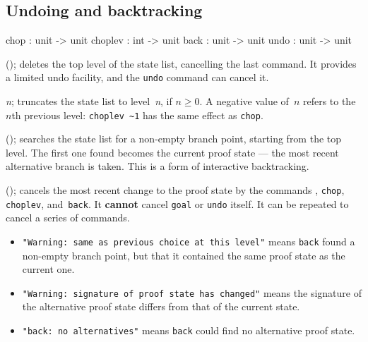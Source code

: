 \subsection{Undoing and backtracking}
\begin{ttbox} 
chop    : unit -> unit
choplev : int -> unit
back    : unit -> unit
undo    : unit -> unit
\end{ttbox}
\begin{ttdescription}
\item[\ttindexbold{chop}();] 
deletes the top level of the state list, cancelling the last 
command.  It provides a limited undo facility, and the {\tt undo} command
can cancel it.

\item[\ttindexbold{choplev} {\it n};] 
truncates the state list to level~{\it n}, if $n\geq0$.  A negative value
of~$n$ refers to the $n$th previous level: 
\hbox{\verb|choplev ~1|} has the same effect as {\tt chop}.

\item[\ttindexbold{back}();]
searches the state list for a non-empty branch point, starting from the top
level.  The first one found becomes the current proof state --- the most
recent alternative branch is taken.  This is a form of interactive
backtracking.

\item[\ttindexbold{undo}();] 
cancels the most recent change to the proof state by the commands ,
{\tt chop}, {\tt choplev}, and~{\tt back}.  It {\bf cannot}
cancel {\tt goal} or {\tt undo} itself.  It can be repeated to
cancel a series of commands.
\end{ttdescription}

\goodbreak
{}\par\nobreak
\begin{itemize}
\item{\footnotesize\tt"Warning:\ same as previous choice at this level"}
  means {\tt back} found a non-empty branch point, but that it contained
  the same proof state as the current one.
\item{\footnotesize\tt "Warning:\ signature of proof state has changed"}
  means the signature of the alternative proof state differs from that of
  the current state.
\item {\footnotesize\tt "back:\ no alternatives"} means {\tt back} could
  find no alternative proof state.
\end{itemize}

